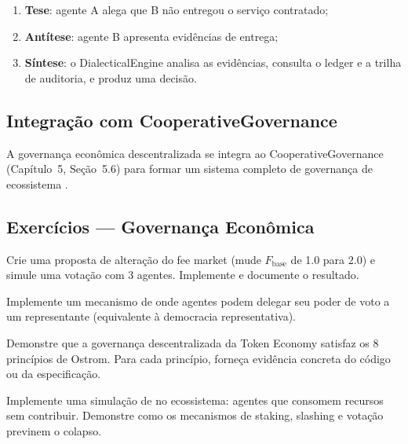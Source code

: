\begin{enumerate}
\item \textbf{Tese}: agente A alega que B não entregou o serviço
contratado;
\item \textbf{Antítese}: agente B apresenta evidências de entrega;
\item \textbf{Síntese}: o DialecticalEngine analisa as evidências,
consulta o ledger e a trilha de auditoria, e produz uma decisão.
\end{enumerate}

\subsection{Integração com CooperativeGovernance}

A governança econômica descentralizada se integra ao
CooperativeGovernance (Capítulo~5, Seção~5.6) para formar um
sistema completo de governança de ecossistema
\cite{opencode2026spec036, ostrom1990governing}.

\subsection{Exercícios — Governança Econômica}

\begin{exercicio}
Crie uma proposta de alteração do fee market (mude $F_{\text{base}}$
de 1.0 para 2.0) e simule uma votação com 3 agentes. Implemente
e documente o resultado.
\end{exercicio}

\begin{exercicio}
Implemente um mecanismo de  onde
agentes podem delegar seu poder de voto a um representante
(equivalente à democracia representativa).
\end{exercicio}

\begin{exercicio}
Demonstre que a governança descentralizada da Token Economy
satisfaz os 8 princípios de Ostrom. Para cada princípio, forneça
evidência concreta do código ou da especificação.
\end{exercicio}

\begin{exercicio}
Implemente uma simulação de  no
ecossistema: agentes que consomem recursos sem contribuir.
Demonstre como os mecanismos de staking, slashing e votação
previnem o colapso.
\end{exercicio}

